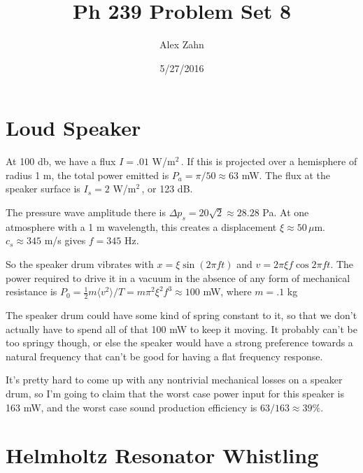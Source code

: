 \documentclass[12pt]{article}
\title{Ph 239 Problem Set 8}
\author{Alex Zahn}
\date{5/27/2016}
\begin{document}
\maketitle

\newcommand{\wmsq}{W/\(\mathrm{m}^2\,\)}
\newcommand{\msq}{\(\mathrm{m}^2\,\)}
\newcommand{\micron}{\(\mu\mathrm{m}\)\,}
\newcommand{\mcb}{\(\mathrm{m}^3\,\)}


\section{Loud Speaker}

At 100 db, we have a flux \(I = .01 \)  \wmsq. If this is projected over a hemisphere of radius 1 m, the total power emitted is \(P_a = \pi/50 \approx 63\) mW. The flux at the speaker surface is \(I_s = 2\) \wmsq, or 123 dB.

The pressure wave amplitude there is \(\Delta p_s = 20\sqrt{2} \approx 28.28\) Pa. At one atmosphere with a 1 m wavelength, this creates a displacement \(\xi \approx 50 \, \mu\)m. \(c_s \approx 345\) m/s  gives \(f = 345\) Hz. 


So the speaker drum vibrates with \(x = \xi \sin(2\pi ft)\) and \(v = 2\pi\xi f \cos 2\pi f t\). The power required to drive it in a vacuum in the absence of any form of mechanical resistance is \(P_0 = \frac{1}{2}m \langle v^2 \rangle/T = m\pi^2\xi^2 f^3 \approx 100  \) mW, where \(m = .1\) kg

The speaker drum could have some kind of spring constant to it, so that we don't actually have to spend all of that 100 mW to keep it moving. It probably can't be too springy though, or else the speaker would have a strong preference towards a natural frequency that can't be good for having a flat frequency response.

It's pretty hard to come up with any nontrivial mechanical losses on a speaker drum, so I'm going to claim that the worst case power input for this speaker is 163 mW, and the worst case sound production efficiency is \(63/163\approx 39\%\).

\section{Helmholtz Resonator Whistling}
\end{document}
